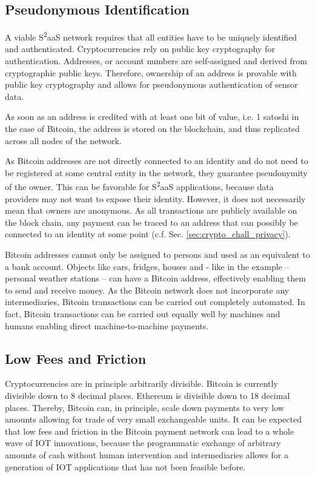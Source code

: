\subsection{Pseudonymous Identification}

A viable S\textsuperscript{2}aaS network requires that all entities have to be uniquely identified and authenticated. Cryptocurrencies rely on public key cryptography for authentication. Addresses, or account numbers are self-assigned and derived from cryptographic public keys. Therefore, ownership of an address is provable with public key cryptography and allows for pseudonymous authentication of sensor data.

As soon as an address is credited with at least one bit of value, i.e. 1 satoshi in the case of Bitcoin, the address is stored on the blockchain, and thus replicated across all nodes of the network.

As Bitcoin addresses are not directly connected to an identity and do not need to be registered at some central entity in the network, they guarantee pseudonymity of the owner. This can be favorable for S\textsuperscript{2}aaS applications, because data providers may not want to expose their identity. However, it does not necessarily mean that owners are anonymous. As all transactions are publicly available on the block chain, any payment can be traced to an address that can possibly be connected to an identity at some point (c.f. Sec. \ref{sec:crypto_chall_privacy}).

Bitcoin addresses cannot only be assigned to persons and used as an equivalent to a bank account. Objects like cars, fridges, houses and - like in the example -- personal weather stations -- can have a Bitcoin address, effectively enabling them to send and receive money. As the Bitcoin network does not incorporate any intermediaries, Bitcoin transactions can be carried out completely automated. In fact, Bitcoin transactions can be carried out equally well by machines and humans enabling direct machine-to-machine payments.

\subsection{Low Fees and Friction}

Cryptocurrencies are in principle arbitrarily divisible. Bitcoin is currently divisible down to 8 decimal places. Ethereum is divisible down to 18 decimal places. 
Thereby, Bitcoin can, in principle, scale down payments to very low amounts allowing for trade of very small exchangeable units. It can be expected that low fees and friction in the Bitcoin payment network can lead to a whole wave of \ac{IOT} innovations, because the programmatic exchange of arbitrary amounts of cash without human intervention and intermediaries allows for a generation of \ac{IOT} applications that has not been feasible before.

